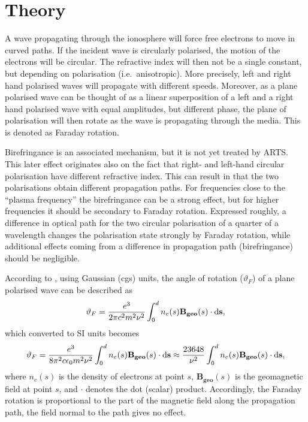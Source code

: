 \section{Theory}
\label{sec:faraday:theory}

A wave propagating through the ionosphere will force free electrons to move in
curved paths. If the incident wave is circularly polarised, the motion of the
electrons will be circular. The refractive index will then not be a single
constant, but depending on polarisation (i.e.\ anisotropic). More precisely,
left and right hand polarised waves will propagate with different speeds.
Moreover, as a plane polarised wave can be thought of as a linear superposition
of a left and a right hand polarised wave with equal amplitudes, but different
phase, the plane of polarisation will then rotate as the wave is propagating
through the media. This is denoted as Faraday rotation.

Birefringance  is an associated mechanism, but it is not
yet treated by ARTS. This later effect originates also on the fact that right-
and left-hand circular polarisation have different refractive index. This can
result in that the two polarisations obtain different propagation paths. For
frequencies close to the ``plasma frequency'' the birefringance can be a strong
effect, but for higher frequencies it should be secondary to Faraday rotation.
Expressed roughly, a difference in optical path for the two circular
polarisation of a quarter of a wavelength changes the polarisation state
strongly by Faraday rotation, while additional effects coming from a difference
in propagation path (birefringance) should be negligible.

According to \citep{rybicki:radia:79}, using Gaussian (cgs) units, the angle of
rotation (\(\vartheta_{F}\)) of a plane polarised wave can be described as
\begin{displaymath}
\vartheta_{F}=
\frac{e^{3}}{2\pi c^2 m^{2}\nu^{2}}
\int_{0}^{d}n_{e}(s) {\bf B_{geo}} (s) \cdot  {\bf \ensuremath{\mathrm{d}}s},  
\end{displaymath}
which converted to SI units becomes
\begin{equation}
\vartheta_{F}=\frac{e^{3}}{8\pi^2 c\epsilon_{0}m^{2}\nu^{2}}
\int_{0}^{d}n_{e}(s) {\bf B_{geo}} (s) \cdot  {\bf \ensuremath{\mathrm{d}}s} \approx
\frac{23648}{\nu^2} \int_{0}^{d}n_{e}(s) {\bf B_{geo}} (s) \cdot  {\bf \ensuremath{\mathrm{d}}s},    
\end{equation}
where \(n_{e}(s)\) is the density of electrons at point \(s\),
\(\mathbf{B_{geo}}(s)\) is the geomagnetic field at point \(s\), and \(\cdot\)
denotes the dot (scalar) product. Accordingly, the Faraday rotation is
proportional to the part of the magnetic field along the propagation path,
the field normal to the path gives no effect.

